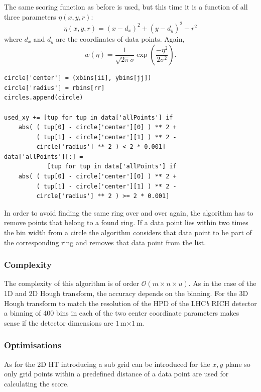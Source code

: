 \documentclass[11pt]{scrreprt}
\begin{document}
The same scoring function as before is used, but this time it is a function of all three parameters $\eta(x,y,r)$:
\begin{equation}
  \eta(x,y,r) = (x - d_x)^2 + (y - d_y)^2 - r ^ 2
\end{equation}
where $d_x$ and $d_y$ are the coordinates of  data points. Again, 
\begin{equation}
  w(\eta) = \frac{1}{\sqrt{2\pi}\sigma}\exp\left( \frac{-\eta^2}{2\sigma^2}\right).
\end{equation}

\begin{codesnippet}[htbp]
\begin{lstlisting}
circle['center'] = (xbins[ii], ybins[jj])
circle['radius'] = rbins[rr]
circles.append(circle)

used_xy += [tup for tup in data['allPoints'] if
    abs( ( tup[0] - circle['center'][0] ) ** 2 +
         ( tup[1] - circle['center'][1] ) ** 2 -
         circle['radius'] ** 2 ) < 2 * 0.001]
data['allPoints'][:] = 
            [tup for tup in data['allPoints'] if 
    abs( ( tup[0] - circle['center'][0] ) ** 2 + 
         ( tup[1] - circle['center'][1] ) ** 2 - 
         circle['radius'] ** 2 ) >= 2 * 0.001]  
\end{lstlisting}
\caption[Remove used points]{In order to avoid finding the same ring over and over again, the algorithm has to remove points that
belong to a found ring. If a data point lies within two times the bin width from a circle the algorithm considers that data point to be 
part of the corresponding ring and removes that data point from the list.}
\label{pc:remove_points}
\end{codesnippet}

\subsubsection{Complexity} %
\label{ssub:complexity}
The complexity of this algorithm is of order $\mathcal{O}(m\times n\times u)$. As in the case of the 1D and 2D Hough transform, the accuracy
depends on the binning. For the 3D Hough transform to match the resolution of the HPD of the LHC\textit{b} RICH detector a binning 
of 400 bins in each of the two center coordinate parameters makes sense if the detector dimensions are $1$\,m$\times1$\,m.

\subsubsection{Optimisations} %
\label{ssub:optimisations}
As for the 2D HT introducing a sub grid can be introduced for the $x,y$ plane so only grid points within a predefined distance of a 
data point are used for calculating the score.
\end{document}

